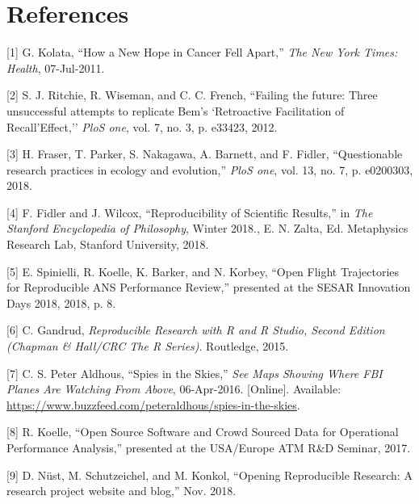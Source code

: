 \documentclass[conference,final,a4paper,]{IEEEtran}
\begin{document}
\section*{References}\label{references}

\vspace{6pt} \setlength{\parskip}{0pt} \footnotesize
\setlength{\parindent}{0cm}

\hypertarget{refs}{}
\hypertarget{ref-kolata_2011}{}
{[}1{]} G. Kolata, ``How a New Hope in Cancer Fell Apart,'' \emph{The
New York Times: Health}, 07-Jul-2011.

\hypertarget{ref-ritchie_2012}{}
{[}2{]} S. J. Ritchie, R. Wiseman, and C. C. French, ``Failing the
future: Three unsuccessful attempts to replicate Bem's `Retroactive
Facilitation of Recall'Effect,'' \emph{PloS one}, vol. 7, no. 3, p.
e33423, 2012.

\hypertarget{ref-fraser_etal_2018}{}
{[}3{]} H. Fraser, T. Parker, S. Nakagawa, A. Barnett, and F. Fidler,
``Questionable research practices in ecology and evolution,'' \emph{PloS
one}, vol. 13, no. 7, p. e0200303, 2018.

\hypertarget{ref-fidler_wilcox_2018}{}
{[}4{]} F. Fidler and J. Wilcox, ``Reproducibility of Scientific
Results,'' in \emph{The Stanford Encyclopedia of Philosophy}, Winter
2018., E. N. Zalta, Ed. Metaphysics Research Lab, Stanford University,
2018.

\hypertarget{ref-spinielli_2018}{}
{[}5{]} E. Spinielli, R. Koelle, K. Barker, and N. Korbey, ``Open Flight
Trajectories for Reproducible ANS Performance Review,'' presented at the
SESAR Innovation Days 2018, 2018, p. 8.

\hypertarget{ref-gandrud_2015}{}
{[}6{]} C. Gandrud, \emph{Reproducible Research with R and R Studio,
Second Edition (Chapman \& Hall/CRC The R Series)}. Routledge, 2015.

\hypertarget{ref-peteraldhous_2016}{}
{[}7{]} C. S. Peter Aldhous, ``Spies in the Skies,'' \emph{See Maps
Showing Where FBI Planes Are Watching From Above}, 06-Apr-2016.
{[}Online{]}. Available:
\url{https://www.buzzfeed.com/peteraldhous/spies-in-the-skies}.

\hypertarget{ref-koelle_open_2017}{}
{[}8{]} R. Koelle, ``Open Source Software and Crowd Sourced Data for
Operational Performance Analysis,'' presented at the USA/Europe ATM R\&D
Seminar, 2017.

\hypertarget{ref-daniel_nust_2018_2361304}{}
{[}9{]} D. Nüst, M. Schutzeichel, and M. Konkol, ``Opening Reproducible
Research: A research project website and blog,'' Nov. 2018.
\end{document}
